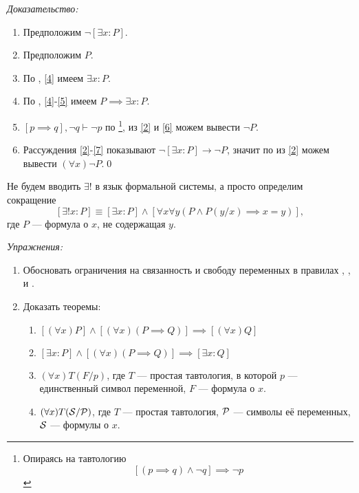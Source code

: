 {\it Доказательство:}
\begin{enumerate}[label=(\arabic*)]
	\item{}\label{2}Предположим $\lnot [\exists x:P]$.
	\item{}\label{4}Предположим $P$.
	\item{}\label{5}По \Eii{}, \ref{4} имеем $\exists x:P$.
	\item{}\label{6}По \implic{}, \ref{4}-\ref{5} имеем
	$P\implies \exists x:P$.
	\item{}\label{7}${[p\implies q],\lnot q\vdash \lnot p}$ по \taut{}\footnote{
		Опираясь на тавтологию
		\[
			[(p\implies q)\land\lnot q]\implies\lnot p
		\]
	}, из
	\ref{2} и \ref{6} можем вывести $\lnot P$.
	\item{}\label{8}Рассуждения \ref{2}-\ref{7} показывают
	$\lnot[\exists x:P]\to\lnot P$, значит по \Aii{} из \ref{2} можем
	вывести $(\forall x)\lnot P$.\qed
\end{enumerate}

Не будем вводить $\exists!$ в язык формальной системы, а просто определим сокращение
\[
	[\exists! x:P]\equiv[\exists x:P]\land[\forall x\forall y(P\land P(y/x)\implies x=y)],
\]
где $P$ --- формула о $x$, не содержащая $y$.

\vspace{1em}
{\it Упражнения:}
\begin{enumerate}
	\item{}Обосновать ограничения на связанность и свободу переменных в правилах
	\Aii{}, \Aee{}, \Eii{} и \Eee{}.
	\item{}\label{ex:obv_thm}Доказать теоремы:
	\begin{enumerate}
		\item{}$[(\forall x)P]\land[(\forall x)(P\implies Q)]
			\implies [(\forall x)Q]$\label{thm:obv_forall}
		\item{}$[\exists x:P]\land[(\forall x)(P\implies Q)]
			\implies [\exists x:Q]$
		\item{}$(\forall x)T(F/p)$, где $T$ --- простая тавтология,
		в которой $p$ --- единственный символ переменной, $F$ --- формула о $x$.
		\item{}$(\forall x)T(\mathcal S/\mathcal P)$, где $T$ --- простая тавтология,
		$\mathcal P$ --- символы её переменных, $\mathcal S$ --- формулы о $x$.\label{thm:obv_taut}
	\end{enumerate}
\end{enumerate}

